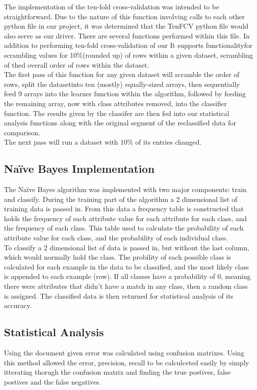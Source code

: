 \documentclass[twoside,11pt]{article}
\begin{document}
The implementation of the ten-fold cross-validation was intended to be straightforward. 
Due to the nature of this function involving calls to each other python file in our 
project, it was determined that the TenFCV python file would also serve as our driver. 
There are several functions performed within this file. In addition to performing 
ten-fold cross-validation of our It supports functionalityfor scrambling values for 
10\%(rounded up) of rows within a given dataset, scrambling of thed overall order of 
rows within the dataset.\\
The first pass of this function for any given dataset will scramble the order of rows, 
split the datasetinto ten (mostly) equally-sized arrays, then sequentially feed 9 arrays 
into the learner function within the algorithm, followed by feeding the remaining array, 
now with class attributes removed, into the classifier function. The results given by 
the classifer are then fed into our statistical analysis functions along with the original 
segment of the reclassified data for comparison.\\
The next pass will run a dataset with 10\% of its entries changed.

\subsection{Naïve Bayes Implementation}

The Naïve Bayes algorithm was implemented with two major components: train and classify. 
During the training part of the algorithm a 2 dimensional list of training data is passed in.
From this data a frequency table is constructed that holds the frequency of each attribute value for each attribute for each class, and the frequency of each class. 
This table used to calculate the probability of each attribute value for each class, and the probability of each individual class.\\
To classify a 2 dimensional list of data is passed in, but without the last column, which would normally hold the class.
The probility of each possible class is calculated for each example in the data to be classified, 
and the most likely class is appended to each example (row).
 If all classes have a probability of 0, meaning there were attributes that didn't have a match in any class, then a random class is assigned.
The classified data is then returned for statistical analysis of its accuracy.

\subsection{Statistical Analysis}
Using the document given \citep{Precision} error was calculated using confusion matrixes.
Using this method allowed the error, precision, recall to be calculceted easily by simply
itterating thorugh the confusion matrix and finding the true postives, false postives and the 
false negatives.
\end{document}
